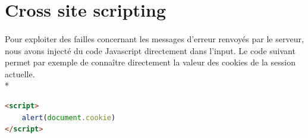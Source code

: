 \documentclass{article}
\begin{document}

\section{Cross site scripting}

\paragraph{}
Pour exploiter des failles concernant les messages d'erreur renvoyés par le serveur, nous avons injecté du code Javascript directement dans l'input. Le code suivant permet par exemple de connaître directement la valeur des cookies de la session actuelle.\\*
\begin{tcolorbox}
\begin{lstlisting}[language=html]
<script>
	alert(document.cookie)
</script>
\end{lstlisting}
\end{tcolorbox}
\end{document}
